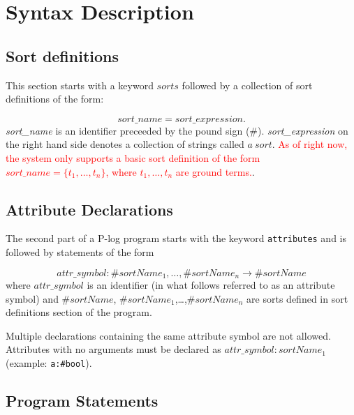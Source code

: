 \documentclass[12pt, letterpaper]{article}
\begin{document}
\section{Syntax Description}


\subsection{Sort definitions}\label{ss}


This section starts with a keyword $sorts$ followed by a collection of sort definitions of the form: 

\begin{equation*}
  sort\_name=sort\_expression.
\end{equation*}
\textit{sort\_name} is an identifier preceeded by the pound sign (\#).
\textit{sort\_expression}  on the right hand side denotes a collection of strings called $a~sort$.
\textcolor{red}{As of right now, the system only supports a basic sort definition of the form $sort\_name = \{t_1,\ldots,t_n\}$, where $t_1,\ldots,t_n$
  are ground terms.}.
  
\subsection{Attribute Declarations}

\noindent  The second part of a  P-log program starts with the keyword \texttt{attributes}
and is followed by statements of the form

\begin{equation*}
attr\_symbol : \#sortName_1,\dots,\#sortName_n \rightarrow \#sortName  
\end{equation*}
where $attr\_symbol$ is an identifier (in what follows referred to as an attribute symbol) and
$\#sortName$, $\#sortName_1$,\dots,$\#sortName_n$ are sorts defined in sort definitions section of the program.



Multiple declarations containing the same attribute symbol are not allowed.
Attributes with no arguments must be declared as $attr\_symbol:sortName_1$ (example: \texttt{a:\#bool}).


\subsection{Program Statements}
\end{document}

